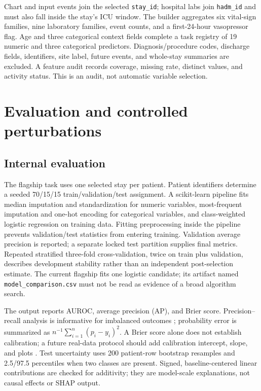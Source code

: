 \documentclass[11pt,a4paper]{article}
\begin{document}
Chart and input events join the selected \texttt{stay\_id}; hospital labs join \texttt{hadm\_id} and must also fall inside the stay's ICU window. The builder aggregates six vital-sign families, nine laboratory families, event counts, and a first-24-hour vasopressor flag. Age and three categorical context fields complete a task registry of 19 numeric and three categorical predictors. Diagnosis/procedure codes, discharge fields, identifiers, site label, future events, and whole-stay summaries are excluded. A feature audit records coverage, missing rate, distinct values, and activity status. This is an audit, not automatic variable selection.

\section{Evaluation and controlled perturbations}

\subsection{Internal evaluation}

The flagship task uses one selected stay per patient. Patient identifiers determine a seeded 70/15/15 train/validation/test assignment. A scikit-learn pipeline fits median imputation and standardization for numeric variables, most-frequent imputation and one-hot encoding for categorical variables, and class-weighted logistic regression on training data. Fitting preprocessing inside the pipeline prevents validation/test statistics from entering training. Validation average precision is reported; a separate locked test partition supplies final metrics. Repeated stratified three-fold cross-validation, twice on train plus validation, describes development stability rather than an independent post-selection estimate. The current flagship fits one logistic candidate; its artifact named \texttt{model\_comparison.csv} must not be read as evidence of a broad algorithm search.

The output reports AUROC, average precision (AP), and Brier score. Precision--recall analysis is informative for imbalanced outcomes \cite{davis2006}; probability error is summarized as $n^{-1}\sum_{i=1}^{n}(p_i-y_i)^2$. A Brier score alone does not establish calibration; a future real-data protocol should add calibration intercept, slope, and plots \cite{vancalster2019}. Test uncertainty uses 200 patient-row bootstrap resamples and 2.5/97.5 percentiles when two classes are present. Signed, baseline-centered linear contributions are checked for additivity; they are model-scale explanations, not causal effects or SHAP output.
\end{document}
